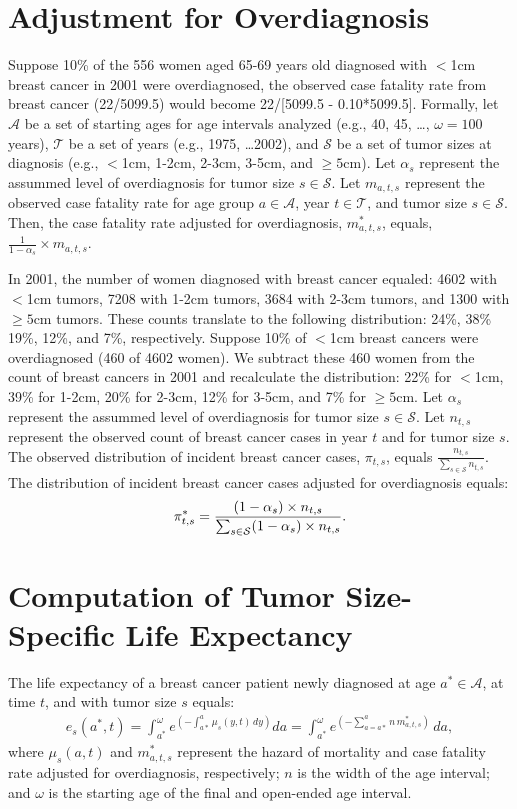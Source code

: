 \documentclass[11pt,letterpaper]{article}
\theoremstyle{plain}
\theoremstyle{remark}
\numberwithin{equation}{section}
\begin{document}
\section{Adjustment for Overdiagnosis}
Suppose 10\% of the 556 women aged 65-69 years old diagnosed with $<$1cm
breast cancer in 2001 were overdiagnosed, the observed case fatality
rate from breast cancer (22/5099.5) would become 22/[5099.5 -
0.10*5099.5].  Formally, let $\mathcal{A}$ be a set of starting ages
for age intervals analyzed (e.g., 40, 45, \dots, $\omega=100$ years), $\mathcal{T}$ be a set of
years (e.g., 1975, \dots 2002), and $\mathcal{S}$ be a set of tumor
sizes at diagnosis (e.g., $<$1cm, 1-2cm, 2-3cm, 3-5cm, and $\geq5$cm).
Let $\alpha_s$ represent the assummed level of overdiagnosis for tumor
size $s\in\mathcal{S}$.  Let $m_{a,t,s}$ represent the observed case
fatality rate for age group $a \in \mathcal{A}$, year $t \in
\mathcal{T}$, and tumor size $s \in \mathcal{S}$.  Then, the case
fatality rate adjusted for overdiagnosis, $m^*_{a,t,s}$, equals,
$\frac{1}{1-\alpha_s} \times m_{a,t,s}$.

In 2001, the number of women diagnosed with breast cancer equaled:
4602 with $<$1cm tumors, 7208 with 1-2cm tumors, 3684 with 2-3cm
tumors, and 1300 with $\geq5$cm tumors.  These counts translate to the
following distribution: 24\%, 38\% 19\%, 12\%, and 7\%, respectively.
Suppose 10\% of $<$1cm breast cancers were overdiagnosed (460 of 4602
women).  We subtract these 460 women from the count of breast cancers
in 2001 and recalculate the distribution: 22\% for $<$1cm, 39\% for
1-2cm, 20\% for 2-3cm, 12\% for 3-5cm, and 7\% for $\geq5$cm.  
Let $\alpha_s$ represent the assummed level of overdiagnosis for tumor
size $s\in\mathcal{S}$.  Let $n_{t,s}$ represent the observed count
of breast cancer cases in year $t$ and for tumor size $s$.  The
observed distribution of incident breast cancer cases, $\pi_{t,s}$, equals
$\frac{n_{t,s}}{\sum_{s\in\mathcal{S}}n_{t,s}}$.  The distribution of
incident breast cancer cases adjusted for overdiagnosis equals: 
\begin{eqnarray}
\pi^*_{t,s}=\frac{(1-\alpha_s) \times n_{t,s}}{\sum_{s\in\mathcal{S}}
  (1-\alpha_s) \times n_{t,s}} \notag.
\end{eqnarray} 

\section{Computation of Tumor Size-Specific Life Expectancy}
The life expectancy of a breast cancer patient newly diagnosed at age
$a^*\in\mathcal{A}$, at time $t$, and with tumor size $s$ equals:
\begin{eqnarray}
 e_s(a^*,t)=\int_{a^*}^{\omega} e^{\left( -\int_{a*}^{a}\mu_s(y,t)\,dy \right)}da =\int_{a^*}^{\omega} e^{\left(-\sum_{a=a*}^{a}n\,m^*_{a,t,s}\right)}\,da ,
\end{eqnarray} 
where $\mu_s(a,t)$ and $m^*_{a,t,s}$ represent the hazard of mortality
and case fatality rate adjusted for overdiagnosis, respectively; $n$
is the width of the age interval; and $\omega$ is the starting age of
the final and open-ended age interval.
\end{document}
